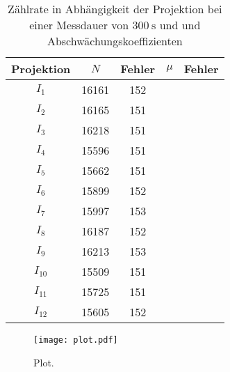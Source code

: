\begin{table}[H]
  \centering
  \caption{Zählrate in Abhängigkeit der Projektion bei einer Messdauer von $\SI{300}{\second}$ und und Abschwächungskoeffizienten }
  \label{tab:Parameter}
  \begin{tabular}{c c c | c c}
    \toprule
    Projektion & $N$ & Fehler & $\mu$ & Fehler   \\
    \midrule
        $I_1$    & 16161 & 152 & &    \\
        $I_2$    & 16165 & 151 & &    \\
        $I_3$    & 16218 & 151 & &    \\
        $I_4$    & 15596 & 151 & &    \\
        $I_5$    & 15662 & 151 & &    \\
        $I_6$    & 15899 & 152 & &    \\
        $I_7$    & 15997 & 153 & &    \\
        $I_8$    & 16187 & 152 & &    \\
        $I_9$    & 16213 & 153 & &    \\
        $I_{10}$ & 15509 & 151 & &   \\
        $I_{11}$ & 15725 & 151 & &    \\
        $I_{12}$ & 15605 & 152 & &    \\
    \bottomrule
  \end{tabular}
\end{table}


\begin{figure}
  \centering
  \texttt{[image: plot.pdf]}
  \caption{Plot.}
  \label{fig:plot}
\end{figure}
